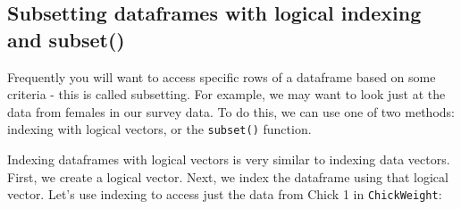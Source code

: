 \documentclass{tufte-book}\usepackage[]{graphicx}\usepackage[]{color}
\makeatletter
\newcommand{\hlopt}[1]{\textcolor[rgb]{0,0,0}{#1}}%
\newcommand{\hlstd}[1]{\textcolor[rgb]{0.345,0.345,0.345}{#1}}%
\newcommand{\hlkwd}[1]{\textcolor[rgb]{0.737,0.353,0.396}{\textbf{#1}}}%
\newenvironment{kframe}{%
 \def\at@end@of@kframe{}%
 \ifinner\ifhmode%
  \def\at@end@of@kframe{\end{minipage}}%
  \begin{minipage}{\columnwidth}%
 \fi\fi%
 \def\FrameCommand##1{\hskip\@totalleftmargin \hskip-\fboxsep
 \colorbox{shadecolor}{##1}\hskip-\fboxsep
     \hskip-\linewidth \hskip-\@totalleftmargin \hskip\columnwidth}%
 \MakeFramed {\advance\hsize-\width
   \@totalleftmargin\z@ \linewidth\hsize
   \@setminipage}}%
 {\par\unskip\endMakeFramed%
 \at@end@of@kframe}
\newenvironment{knitrout}{}{} %
\makeatother
\begin{document}
\begin{footnotesize}


\section{Subsetting dataframes with logical indexing and subset()}

Frequently you will want to access specific rows of a dataframe based on some criteria - this is called subsetting. For example, we may want to look just at the data from females in our survey data. To do this, we can use one of two methods: indexing with logical vectors, or the \texttt{subset()} function.

Indexing dataframes with logical vectors is very similar to indexing data vectors. First, we create a logical vector. Next, we index the dataframe using that logical vector. Let's use indexing to access just the data from Chick 1 in \texttt{ChickWeight}:


\end{footnotesize}
\end{document}
